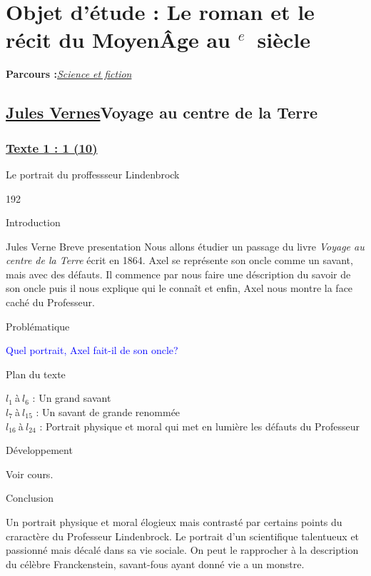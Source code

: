 \documentclass[12pt,a4paper]{article}
\begin{document}
		\section[Sciences et fiction]{Objet d'\'etude : Le roman et le r\'ecit du Moyen\^Age au \textsc{}$^{e}$~siècle}
		\textbf{Parcours :}\textit{\underline{Science et fiction}}
			\subsection{\href{Bio/Jules.pdf}{Jules Vernes}Voyage au centre de la Terre}
				\subsubsection[Texte 1 (10)]{\textbf{\underline{Texte 1 : 1 (10)}}}
			Le portrait du proffessseur Lindenbrock	
\begin{dingautolist}{192}

\item Introduction \par
Jules Verne Breve presentation
Nous allons étudier un passage du livre \textit{Voyage au centre de la Terre} écrit en 1864. Axel se représente son oncle comme un savant, mais avec des défauts.
Il commence par nous faire une déscription du savoir de son oncle puis il nous explique qui le connaît et enfin, Axel nous montre la face caché du Professeur.
\item Probl\'ematique \par
	\textcolor{blue}{Quel portrait, Axel fait-il de son oncle?}
\item Plan du texte \par	
	$l_{1}~$\`a$~l_{6}$ : Un grand savant\\
    $l_{7}~$\`a$~l_{15}$ : Un savant de grande renommée\\
    $l_{16}~$\`a$~l_{24}$ : Portrait physique et moral qui met en lumière les défauts du Professeur
\item D\'eveloppement \par
        Voir cours.

\item Conclusion \par
Un portrait physique et moral élogieux mais contrasté par certains points du craractère du Professeur Lindenbrock. Le portrait d'un scientifique talentueux et passionné mais décalé dans sa vie sociale.
On peut le rapprocher à la description du célèbre Franckenstein, savant-fous ayant donné vie a un monstre.


\end{dingautolist}
\newpage
\end{document}
